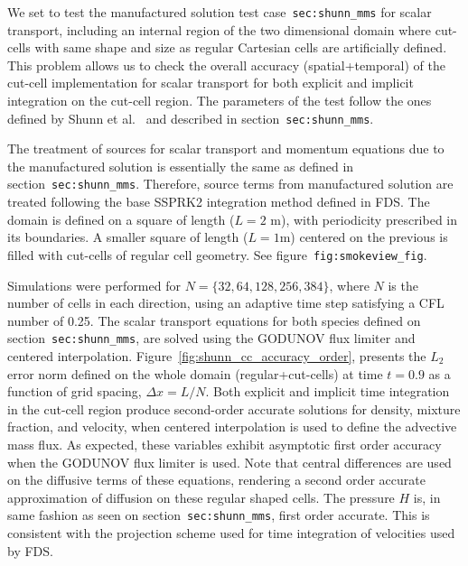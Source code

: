 \documentclass[12pt]{article}
\begin{document}
\label{sec:shunn_cc_mms}


We set to test the manufactured solution test case~\texttt{sec:shunn\_mms} for scalar transport, including an internal region of the two dimensional domain where cut-cells with same shape and size as regular Cartesian cells are artificially defined. This problem allows us to check the overall accuracy (spatial+temporal) of the cut-cell implementation for scalar transport for both explicit and implicit integration on the cut-cell region.
The parameters of the test follow the ones defined by Shunn et al.~\cite{Shunn:2012} and described in section~\texttt{sec:shunn\_mms}.

The treatment of sources for scalar transport and momentum equations due to the manufactured solution is essentially the same as defined in section~\texttt{sec:shunn\_mms}. Therefore, source terms from manufactured solution are treated following the base SSPRK2 integration method defined in FDS.
The domain is defined on a square of length ($L=2$ m), with periodicity prescribed in its boundaries. A smaller square of length ($L=1$m) centered on the previous is filled with cut-cells of regular cell geometry. See figure~\texttt{fig:smokeview\_fig}. 




Simulations were performed for $N = \{32, 64, 128, 256, 384\}$, where $N$ is the number of cells in each direction, using an adaptive time step satisfying a CFL number of 0.25. The scalar transport equations for both species defined on section~\texttt{sec:shunn\_mms}, are solved using the GODUNOV flux limiter and centered interpolation. Figure~\ref{fig:shunn_cc_accuracy_order}, presents the $L_2$ error norm defined on the whole domain (regular+cut-cells) at time $t = 0.9$ as a function of grid spacing, $\Delta x = L/N$. Both explicit and implicit time integration in the cut-cell region produce second-order accurate solutions for density, mixture fraction, and velocity, when centered interpolation is used to define the advective mass flux. As expected, these variables exhibit asymptotic first order accuracy when the GODUNOV flux limiter is used. Note that central differences are used on the diffusive terms of these equations, rendering a second order accurate approximation of diffusion on these regular shaped cells. The pressure $H$ is, in same fashion as seen on section~\texttt{sec:shunn\_mms}, first order accurate. This is consistent with the projection scheme used for time integration of velocities used by FDS.
\end{document}
